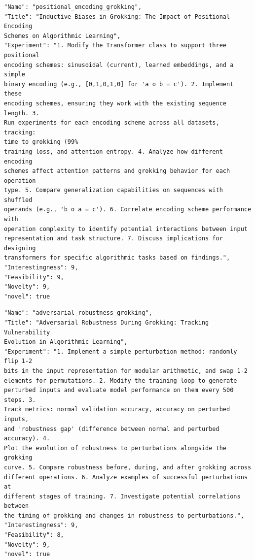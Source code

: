 \documentclass[11pt, a4paper]{include/gdm_format}
\begin{document}
\begin{tcolorbox}[breakable,colback=blue!5!white, colframe=blue!75!black, title=Idea 17/50 - \texttt{positional\_encoding\_grokking}]
\small
\begin{verbatim}
"Name": "positional_encoding_grokking",
"Title": "Inductive Biases in Grokking: The Impact of Positional Encoding
Schemes on Algorithmic Learning",
"Experiment": "1. Modify the Transformer class to support three positional
encoding schemes: sinusoidal (current), learned embeddings, and a simple
binary encoding (e.g., [0,1,0,1,0] for 'a o b = c'). 2. Implement these
encoding schemes, ensuring they work with the existing sequence length. 3.
Run experiments for each encoding scheme across all datasets, tracking:
time to grokking (99%
training loss, and attention entropy. 4. Analyze how different encoding
schemes affect attention patterns and grokking behavior for each operation
type. 5. Compare generalization capabilities on sequences with shuffled
operands (e.g., 'b o a = c'). 6. Correlate encoding scheme performance with
operation complexity to identify potential interactions between input
representation and task structure. 7. Discuss implications for designing
transformers for specific algorithmic tasks based on findings.",
"Interestingness": 9,
"Feasibility": 9,
"Novelty": 9,
"novel": true
\end{verbatim}
\end{tcolorbox}

\begin{tcolorbox}[breakable,colback=blue!5!white, colframe=blue!75!black, title=Idea 18/50 - \texttt{adversarial\_robustness\_grokking}]
\small
\begin{verbatim}
"Name": "adversarial_robustness_grokking",
"Title": "Adversarial Robustness During Grokking: Tracking Vulnerability
Evolution in Algorithmic Learning",
"Experiment": "1. Implement a simple perturbation method: randomly flip 1-2
bits in the input representation for modular arithmetic, and swap 1-2
elements for permutations. 2. Modify the training loop to generate
perturbed inputs and evaluate model performance on them every 500 steps. 3.
Track metrics: normal validation accuracy, accuracy on perturbed inputs,
and 'robustness gap' (difference between normal and perturbed accuracy). 4.
Plot the evolution of robustness to perturbations alongside the grokking
curve. 5. Compare robustness before, during, and after grokking across
different operations. 6. Analyze examples of successful perturbations at
different stages of training. 7. Investigate potential correlations between
the timing of grokking and changes in robustness to perturbations.",
"Interestingness": 9,
"Feasibility": 8,
"Novelty": 9,
"novel": true
\end{verbatim}
\end{tcolorbox}
\end{document}
